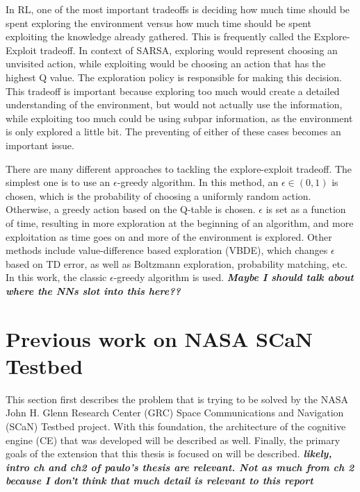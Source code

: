 \documentclass[11pt]{report}
\begin{document}
	\par In RL, one of the most important tradeoffs is deciding how much time should be spent exploring the environment versus how much time should be spent exploiting the knowledge already gathered. This is frequently called the Explore-Exploit tradeoff. In context of SARSA, exploring would represent choosing an unvisited action, while exploiting would be choosing an action that has the highest Q value. The exploration policy is responsible for making this decision. This tradeoff is important because exploring too much would create a detailed understanding of the environment, but would not actually use the information, while exploiting too much could be using subpar information, as the environment is only explored a little bit. The preventing of either of these cases becomes an important issue. 
	\par There are many different approaches to tackling the explore-exploit tradeoff. The simplest one is to use an $\epsilon$-greedy algorithm. In this method, an $\epsilon \in (0,1)$ is chosen, which is the probability of choosing a uniformly random action. Otherwise, a greedy action based on the Q-table is chosen. $\epsilon$ is set as a function of time, resulting in more exploration at the beginning of an algorithm, and more exploitation as time goes on and more of the environment is explored. Other methods include value-difference based exploration (VBDE), which changes $\epsilon$ based on TD error, as well as Boltzmann exploration, probability matching, etc. In this work, the classic $\epsilon$-greedy algorithm is used. 
	\textbf{\textit{Maybe I should talk about where the NNs slot into this here??}}
	
	\section{Previous work on NASA SCaN Testbed}
	\par This section first describes the problem that is trying to be solved by the NASA John H. Glenn Research Center (GRC) Space Communications and Navigation (SCaN) Testbed project. With this foundation, the architecture of the cognitive engine (CE) that was developed will be described as well. Finally, the primary goals of the extension that this thesis is focused on will be described.
	\textbf{\textit{likely, intro ch and ch2 of paulo's thesis are relevant. Not as much from ch 2 because I don't think that much detail is relevant to this report}}
\end{document}
